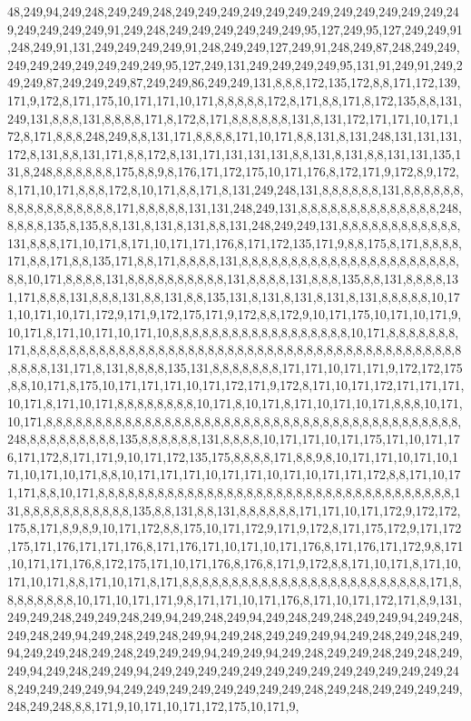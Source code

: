 48,249,94,249,248,249,249,248,249,249,249,249,249,249,249,249,249,249,249,249,249,249,249,249,249,91,249,248,249,249,249,249,249,249,95,127,249,95,127,249,249,91,248,249,91,131,249,249,249,249,91,248,249,249,127,249,91,248,249,87,248,249,249,249,249,249,249,249,249,249,95,127,249,131,249,249,249,249,95,131,91,249,91,249,249,249,87,249,249,249,87,249,249,86,249,249,131,8,8,8,172,135,172,8,8,171,172,139,171,9,172,8,171,175,10,171,171,10,171,8,8,8,8,8,172,8,171,8,8,171,8,172,135,8,8,131,249,131,8,8,8,131,8,8,8,8,171,8,172,8,171,8,8,8,8,8,8,131,8,131,172,171,171,10,171,172,8,171,8,8,8,248,249,8,8,131,171,8,8,8,8,171,10,171,8,8,131,8,131,248,131,131,131,172,8,131,8,8,131,171,8,8,172,8,131,171,131,131,131,8,8,131,8,131,8,8,131,131,135,131,8,248,8,8,8,8,8,8,175,8,8,9,8,176,171,172,175,10,171,176,8,172,171,9,172,8,9,172,8,171,10,171,8,8,8,172,8,10,171,8,8,171,8,131,249,248,131,8,8,8,8,8,8,131,8,8,8,8,8,8,8,8,8,8,8,8,8,8,8,8,8,171,8,8,8,8,8,131,131,248,249,131,8,8,8,8,8,8,8,8,8,8,8,8,8,8,248,8,8,8,8,135,8,135,8,8,131,8,131,8,131,8,8,131,248,249,249,131,8,8,8,8,8,8,8,8,8,8,8,8,131,8,8,8,171,10,171,8,171,10,171,171,176,8,171,172,135,171,9,8,8,175,8,171,8,8,8,8,171,8,8,171,8,8,135,171,8,8,171,8,8,8,8,131,8,8,8,8,8,8,8,8,8,8,8,8,8,8,8,8,8,8,8,8,8,8,8,8,10,171,8,8,8,8,131,8,8,8,8,8,8,8,8,8,8,131,8,8,8,8,131,8,8,8,135,8,8,131,8,8,8,8,131,171,8,8,8,131,8,8,8,131,8,8,131,8,8,135,131,8,131,8,131,8,131,8,131,8,8,8,8,8,10,171,10,171,10,171,172,9,171,9,172,175,171,9,172,8,8,172,9,10,171,175,10,171,10,171,9,10,171,8,171,10,171,10,171,10,8,8,8,8,8,8,8,8,8,8,8,8,8,8,8,8,8,8,10,171,8,8,8,8,8,8,8,171,8,8,8,8,8,8,8,8,8,8,8,8,8,8,8,8,8,8,8,8,8,8,8,8,8,8,8,8,8,8,8,8,8,8,8,8,8,8,8,8,8,8,8,8,8,8,8,8,131,171,8,131,8,8,8,8,135,131,8,8,8,8,8,8,8,171,171,10,171,171,9,172,172,175,8,8,10,171,8,175,10,171,171,171,10,171,172,171,9,172,8,171,10,171,172,171,171,171,10,171,8,171,10,171,8,8,8,8,8,8,8,8,10,171,8,10,171,8,171,10,171,10,171,8,8,8,10,171,10,171,8,8,8,8,8,8,8,8,8,8,8,8,8,8,8,8,8,8,8,8,8,8,8,8,8,8,8,8,8,8,8,8,8,8,8,8,8,8,8,8,8,8,248,8,8,8,8,8,8,8,8,8,135,8,8,8,8,8,8,131,8,8,8,8,10,171,171,10,171,175,171,10,171,176,171,172,8,171,171,9,10,171,172,135,175,8,8,8,8,171,8,8,9,8,10,171,171,10,171,10,171,10,171,10,171,8,8,10,171,171,171,10,171,171,10,171,10,171,171,172,8,8,171,10,171,171,8,8,10,171,8,8,8,8,8,8,8,8,8,8,8,8,8,8,8,8,8,8,8,8,8,8,8,8,8,8,8,8,8,8,8,8,8,8,8,8,131,8,8,8,8,8,8,8,8,8,8,8,135,8,8,131,8,8,131,8,8,8,8,8,8,171,171,10,171,172,9,172,172,175,8,171,8,9,8,9,10,171,172,8,8,175,10,171,172,9,171,9,172,8,171,175,172,9,171,172,175,171,176,171,171,176,8,171,176,171,10,171,10,171,176,8,171,176,171,172,9,8,171,10,171,171,176,8,172,175,171,10,171,176,8,176,8,171,9,172,8,8,171,10,171,8,171,10,171,10,171,8,8,171,10,171,8,171,8,8,8,8,8,8,8,8,8,8,8,8,8,8,8,8,8,8,8,8,8,8,8,8,8,171,8,8,8,8,8,8,8,8,10,171,10,171,171,9,8,171,171,10,171,176,8,171,10,171,172,171,8,9,131,249,249,248,249,249,248,249,94,249,248,249,94,249,248,249,248,249,249,94,249,248,249,248,249,94,249,248,249,248,249,94,249,248,249,249,249,94,249,248,249,248,249,94,249,249,248,249,248,249,249,249,94,249,249,94,249,248,249,249,248,249,248,249,249,94,249,248,249,249,94,249,249,249,249,249,249,249,249,249,249,249,249,249,248,249,249,249,249,94,249,249,249,249,249,249,249,249,248,249,248,249,249,249,249,248,249,248,8,8,171,9,10,171,10,171,172,175,10,171,9,